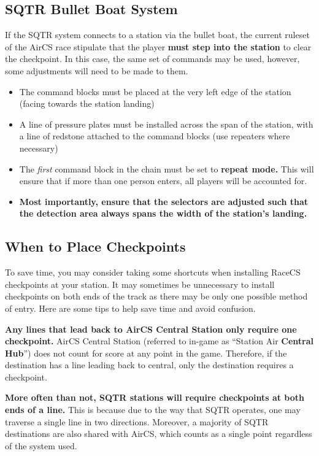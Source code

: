\documentclass{article}
\begin{document}
\subsection{SQTR Bullet Boat System}
If the SQTR system connects to a station via the bullet boat, the current ruleset of the AirCS race stipulate that the player \textbf{must step into the station} to clear the checkpoint. In this case, the same set of commands may be used, however, some adjustments will need to be made to them.
\begin{itemize}
    \item The command blocks must be placed at the very left edge of the station (facing towards the station landing)
    \item A line of pressure plates must be installed across the span of the station, with a line of redstone attached to the command blocks (use repeaters where necessary)
    \item The \textit{first} command block in the chain must be set to \textbf{repeat mode.} This will ensure that if more than one person enters, all players will be accounted for.
    \item \textbf{Most importantly, ensure that the selectors are adjusted such that the detection area always spans the width of the station's landing.}
\end{itemize}

\subsection{When to Place Checkpoints}
To save time, you may consider taking some shortcuts when installing RaceCS checkpoints at your station. It may sometimes be unnecessary to install checkpoints on both ends of the track as there may be only one possible method of entry. Here are some tips to help save time and avoid confusion.

\medskip

\textbf{Any lines that lead back to AirCS Central Station only require one checkpoint.} AirCS Central Station (referred to in-game as ``Station Air \textbf{Central Hub}'') does not count for score at any point in the game. Therefore, if the destination has a line leading back to central, only the destination requires a checkpoint.

\medskip

\textbf{More often than not, SQTR stations will require checkpoints at both ends of a line.} This is because due to the way that SQTR operates, one may traverse a single line in two directions. Moreover, a majority of SQTR destinations are also shared with AirCS, which counts as a single point regardless of the system used.
\end{document}
